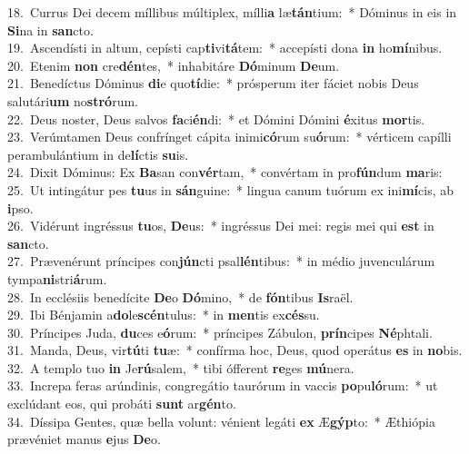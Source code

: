 {18.~}Currus Dei decem míllibus múltiplex, mílli\textbf{a} læ\textbf{tán}tium:~* Dóminus in eis in \textbf{Si}na in \textbf{san}cto.\\
{19.~}Ascendísti in altum, cepísti cap\textbf{ti}vi\textbf{tá}tem:~* accepísti dona \textbf{in} ho\textbf{mí}nibus.\\
{20.~}Etenim \textbf{non} cre\textbf{dén}tes,~* inhabitáre \textbf{Dó}minum \textbf{De}um.\\
{21.~}Benedíctus Dóminus \textbf{di}e quo\textbf{tí}die:~* prósperum iter fáciet nobis Deus salutári\textbf{um} no\textbf{stró}rum.\\
{22.~}Deus noster, Deus salvos \textbf{fa}ci\textbf{én}di:~* et Dómini Dómini \textbf{é}xitus \textbf{mor}tis.\\
{23.~}Verúmtamen Deus confrínget cápita inimi\textbf{có}rum su\textbf{ó}rum:~* vérticem capílli perambulántium in de\textbf{lí}ctis \textbf{su}is.\\
{24.~}Dixit Dóminus: Ex \textbf{Ba}san con\textbf{vér}tam,~* convértam in pro\textbf{fún}dum \textbf{ma}ris:\\
{25.~}Ut intingátur pes \textbf{tu}us in \textbf{sán}guine:~* lingua canum tuórum ex ini\textbf{mí}cis, ab \textbf{i}pso.\\
{26.~}Vidérunt ingréssus \textbf{tu}os, \textbf{De}us:~* ingréssus Dei mei: regis mei qui \textbf{est} in \textbf{san}cto.\\
{27.~}Prævenérunt príncipes con\textbf{jún}cti psal\textbf{lén}tibus:~* in médio juvenculárum tympa\textbf{ni}stri\textbf{á}rum.\\
{28.~}In ecclésiis benedícite \textbf{De}o \textbf{Dó}mino,~* de \textbf{fón}tibus \textbf{Is}raël.\\
{29.~}Ibi Bénjamin a\textbf{do}le\textbf{scén}tulus:~* in \textbf{men}tis ex\textbf{cés}su.\\
{30.~}Príncipes Juda, \textbf{du}ces e\textbf{ó}rum:~* príncipes Zábulon, \textbf{prín}cipes \textbf{Né}phtali.\\
{31.~}Manda, Deus, vir\textbf{tú}ti \textbf{tu}æ:~* confírma hoc, Deus, quod operátus \textbf{es} in \textbf{no}bis.\\
{32.~}A templo tuo \textbf{in} Je\textbf{rú}salem,~* tibi ófferent \textbf{re}ges \textbf{mú}nera.\\
{33.~}Increpa feras arúndinis, congregátio taurórum in vaccis \textbf{po}pu\textbf{ló}rum:~* ut exclúdant eos, qui probáti \textbf{sunt} ar\textbf{gén}to.\\
{34.~}Díssipa Gentes, quæ bella volunt: vénient legáti \textbf{ex} Æ\textbf{gýp}to:~* Æthiópia prævéniet manus \textbf{e}jus \textbf{De}o.\\

